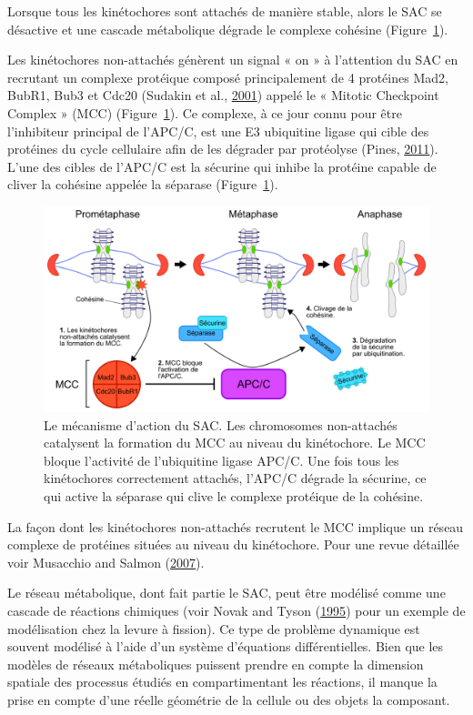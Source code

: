 \documentclass[12pt,a4paper,twoside,openright]{book}
\begin{document}
Lorsque tous les kinétochores sont attachés de manière stable, alors le
SAC se désactive et une cascade métabolique dégrade le complexe cohésine
(Figure~\ref{fig:sac}).

Les kinétochores non-attachés génèrent un signal « on » à l'attention du
SAC en recrutant un complexe protéique composé principalement de 4
protéines Mad2, BubR1, Bub3 et Cdc20 (Sudakin et al.,
\hyperref[ref-Sudakin2001]{2001}) appelé le « Mitotic Checkpoint Complex
» (MCC) (Figure~\ref{fig:sac}). Ce complexe, à ce jour connu pour être
l'inhibiteur principal de l'APC/C, est une E3 ubiquitine ligase qui
cible des protéines du cycle cellulaire afin de les dégrader par
protéolyse (Pines, \hyperref[ref-Pines2011]{2011}). L'une des cibles de
l'APC/C est la sécurine qui inhibe la protéine capable de cliver la
cohésine appelée la séparase (Figure~\ref{fig:sac}).

\begin{figure}[htbp]
\centering
\includegraphics{figures/intro/sac.png}
\caption[Le mécanisme d'action du SAC]{\label{fig:sac}Le mécanisme
d'action du SAC. Les chromosomes non-attachés catalysent la formation du
MCC au niveau du kinétochore. Le MCC bloque l'activité de l'ubiquitine
ligase APC/C. Une fois tous les kinétochores correctement attachés,
l'APC/C dégrade la sécurine, ce qui active la séparase qui clive le
complexe protéique de la cohésine.}
\end{figure}

La façon dont les kinétochores non-attachés recrutent le MCC implique un
réseau complexe de protéines situées au niveau du kinétochore. Pour une
revue détaillée voir Musacchio and Salmon
(\hyperref[ref-Musacchio2007]{2007}).

Le réseau métabolique, dont fait partie le SAC, peut être modélisé comme
une cascade de réactions chimiques (voir Novak and Tyson
(\hyperref[ref-Novak1995]{1995}) pour un exemple de modélisation chez la
levure à fission). Ce type de problème dynamique est souvent modélisé à
l'aide d'un système d'équations différentielles. Bien que les modèles de
réseaux métaboliques puissent prendre en compte la dimension spatiale
des processus étudiés en compartimentant les réactions, il manque la
prise en compte d'une réelle géométrie de la cellule ou des objets la
composant.
\end{document}
